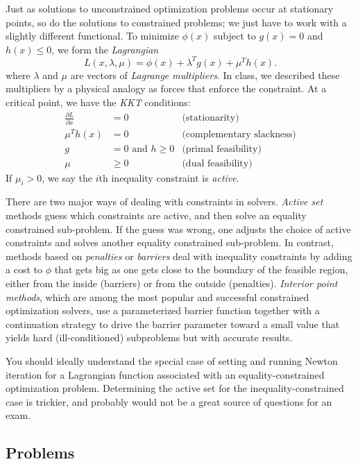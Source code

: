 \documentclass[12pt, leqno]{article}
\begin{document}
Just as solutions to unconstrained optimization problems
occur at stationary points, so do the solutions to constrained
problems; we just have to work with a slightly different functional.
To minimize $\phi(x)$ subject to $g(x) = 0$ and $h(x) \leq 0$,
we form the {\em Lagrangian}
\[
  L(x,\lambda,\mu) = \phi(x) + \lambda^T g(x) + \mu^T h(x).
\]
where $\lambda$ and $\mu$ are vectors of {\em Lagrange multipliers}.
In class, we described these multipliers by a physical analogy as
forces that enforce the constraint.
At a critical point, we have the {\em KKT} conditions:
\begin{align*}
  \frac{\partial L}{\partial x} &= 0 & \mbox{(stationarity)}\\
  \mu^T h(x) & = 0 & \mbox{(complementary slackness)} \\
  g &= 0 \mbox{ and } h \geq 0 & \mbox{(primal feasibility)} \\
  \mu &\geq 0 & \mbox{(dual feasibility)}
\end{align*}
If $\mu_i > 0$, we say the $i$th inequality constraint is {\em active}.

There are two major ways of dealing with constraints in solvers.
{\em Active set} methods guess which constraints are active,
and then solve an equality constrained sub-problem.  If the guess
was wrong, one adjusts the choice of active constraints and solves
another equality constrained sub-problem.  In contrast, methods
based on {\em penalties} or {\em barriers} deal with inequality
constraints by adding a cost to $\phi$ that gets big as one
gets close to the boundary of the feasible region, either from the
inside (barriers) or from the outside (penalties).  
{\em Interior point methods}, which are among the most popular
and successful constrained optimization solvers, use a parameterized
barrier function together with a continuation strategy to drive the
barrier parameter toward a small value that yields hard
(ill-conditioned) subproblems but with accurate results.

You should ideally understand the special case of setting and running
Newton iteration for a Lagrangian function associated with an
equality-constrained optimization problem.  Determining the
active set for the inequality-constrained case is trickier,
and probably would not be a great source of questions for
an exam.

\subsection{Problems}
\end{document}
